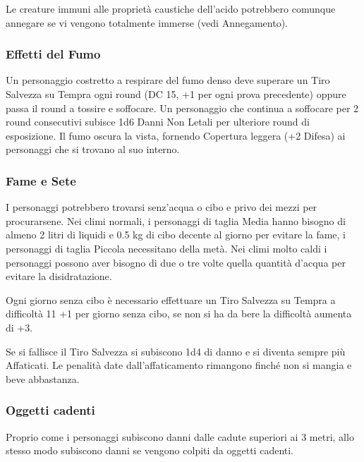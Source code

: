 \begin{multicols}{2}
Le creature immuni alle proprietà caustiche dell'acido potrebbero comunque annegare se vi vengono totalmente immerse (vedi Annegamento).

\subsubsection{Effetti del Fumo}

\label{effetti-del-fumo}

Un personaggio costretto a respirare del fumo denso deve superare un Tiro Salvezza su Tempra ogni round (DC 15, +1 per ogni prova precedente) oppure passa il round a tossire e soffocare. Un personaggio che continua a soffocare per 2 round consecutivi subisce 1d6 Danni Non Letali per ulteriore round di esposizione. Il fumo oscura la vista, fornendo Copertura leggera (+2 Difesa) ai personaggi che si trovano al suo interno.

\subsubsection{Fame e Sete}

\label{fame-e-sete}

I personaggi potrebbero trovarsi senz'acqua o cibo e privo dei mezzi per procurarsene. Nei climi normali, i personaggi di taglia Media hanno bisogno di almeno 2 litri di liquidi e 0.5 kg di cibo decente al giorno per evitare la fame, i personaggi di taglia Piccola necessitano della metà. Nei climi molto caldi i personaggi possono aver bisogno di due o tre volte quella quantità d'acqua per evitare la disidratazione.

Ogni giorno senza cibo è necessario effettuare un Tiro Salvezza su Tempra a difficoltà 11 +1 per giorno senza cibo, se non si ha da bere la difficoltà aumenta di +3.

Se si fallisce il Tiro Salvezza si subiscono 1d4 di danno e si diventa sempre più Affaticati. Le penalità date dall'affaticamento rimangono finché non si mangia e beve abbastanza.

\subsubsection{Oggetti cadenti}

\label{oggetti-cadenti}

Proprio come i personaggi subiscono danni dalle cadute superiori ai 3 metri, allo stesso modo subiscono danni se vengono colpiti da oggetti cadenti.


\end{multicols}
